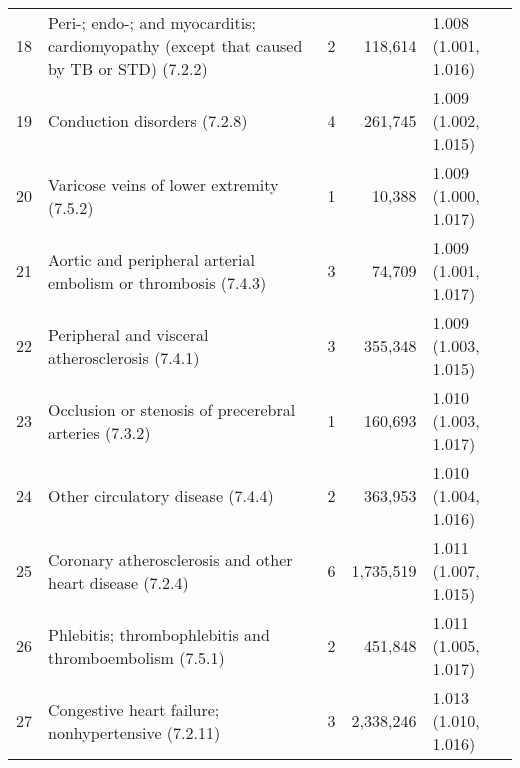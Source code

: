 \begin{tabular}{lp{6.5cm}rrp{2.2cm}}
    18 & Peri-; endo-; and myocarditis; cardiomyopathy (except that caused by TB or STD) (7.2.2) &    2 & 118,614 & 1.008 (1.001, 1.016) \\ 
    19 & Conduction disorders (7.2.8) &    4 & 261,745 & 1.009 (1.002, 1.015) \\ 
    20 & Varicose veins of lower extremity (7.5.2) &    1 & 10,388 & 1.009 (1.000, 1.017) \\ 
    21 & Aortic and peripheral arterial embolism or thrombosis (7.4.3) &    3 & 74,709 & 1.009 (1.001, 1.017) \\ 
    22 & Peripheral and visceral atherosclerosis (7.4.1) &    3 & 355,348 & 1.009 (1.003, 1.015) \\ 
    23 & Occlusion or stenosis of precerebral arteries (7.3.2) &    1 & 160,693 & 1.010 (1.003, 1.017) \\ 
    24 & Other circulatory disease (7.4.4) &    2 & 363,953 & 1.010 (1.004, 1.016) \\ 
    25 & Coronary atherosclerosis and other heart disease (7.2.4) &    6 & 1,735,519 & 1.011 (1.007, 1.015) \\ 
    26 & Phlebitis; thrombophlebitis and thromboembolism (7.5.1) &    2 & 451,848 & 1.011 (1.005, 1.017) \\ 
    27 & Congestive heart failure; nonhypertensive (7.2.11) &    3 & 2,338,246 & 1.013 (1.010, 1.016) \\ 
   \hline
\end{tabular}

